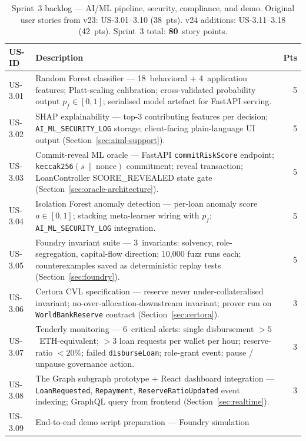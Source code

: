 \begin{table}[H]
\centering
\caption{Sprint~3 backlog --- AI/ML pipeline, security, compliance, and demo.
Original user stories from v23: US-3.01--3.10 (38~pts). v24 additions:
US-3.11--3.18 (42~pts). Sprint~3 total: \textbf{80}~story points.}
\label{tab:sprint3}
\small
\begin{tabular}{p{1.3cm}p{10.2cm}r}
\hline
\textbf{US-ID} & \textbf{Description} & \textbf{Pts} \\
\hline
US-3.01 & Random Forest classifier --- 18~behavioral + 4~application
  features; Platt-scaling calibration; cross-validated probability
  output $p_f \in [0,1]$; serialised model artefact for FastAPI serving. & 5 \\
US-3.02 & SHAP explainability --- top-3 contributing features per
  decision; \texttt{AI\_ML\_SECURITY\_LOG} storage; client-facing
  plain-language UI output
  (Section~\ref{sec:aiml-support}). & 5 \\
US-3.03 & Commit-reveal ML oracle --- FastAPI \texttt{commitRiskScore}
  endpoint; \texttt{keccak256}$(s\,\|\,\text{nonce})$ commitment;
  reveal transaction; LoanController SCORE\_REVEALED state gate
  (Section~\ref{sec:oracle-architecture}). & 5 \\
US-3.04 & Isolation Forest anomaly detection --- per-loan anomaly score
  $a \in [0,1]$; stacking meta-learner wiring with $p_f$;
  \texttt{AI\_ML\_SECURITY\_LOG} integration. & 5 \\
US-3.05 & Foundry invariant suite --- 3~invariants: solvency,
  role-segregation, capital-flow direction; 10{,}000 fuzz runs each;
  counterexamples saved as deterministic replay tests
  (Section~\ref{sec:foundry}). & 5 \\
US-3.06 & Certora CVL specification --- reserve never under-collateralised
  invariant; no-over-allocation-downstream invariant; prover run on
  \texttt{WorldBankReserve} contract
  (Section~\ref{sec:certora}). & 3 \\
US-3.07 & Tenderly monitoring --- 6~critical alerts: single disbursement
  $>5$~ETH-equivalent; $>3$ loan requests per wallet per hour;
  reserve-ratio $<20\%$; failed \texttt{disburseLoan}; role-grant event;
  pause / unpause governance action. & 3 \\
US-3.08 & The Graph subgraph prototype + React dashboard integration ---
  \texttt{LoanRequested}, \texttt{Repayment}, \texttt{ReserveRatioUpdated}
  event indexing; GraphQL query from frontend
  (Section~\ref{sec:realtime}). & 3 \\
US-3.09 & End-to-end demo script preparation --- Foundry simulation

\end{tabular}
\end{table}
